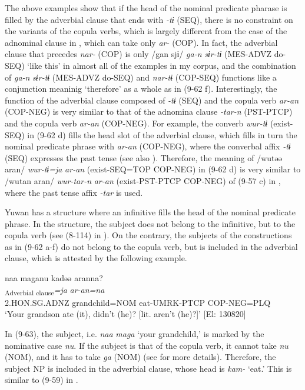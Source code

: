 The above examples show that if the head of the nominal predicate pharase is filled by the adverbial clause that ends with \textit{{}-tɨ} (SEQ), there is no constraint on the variants of the copula verbs, which is largely different from the case of the adnominal clause in , which can take only \textit{ar-} (COP). In fact, the adverbial clause that precedes \textit{nar-} (COP) is only /gan sjɨ/ \textit{ga-n} \textit{sɨr-tɨ} (MES-ADVZ do-SEQ) ‘like this’ in almost all of the examples in my corpus, and the combination of \textit{ga-n} \textit{sɨr-tɨ} (MES-ADVZ do-SEQ) and \textit{nar-tɨ} (COP-SEQ) functions like a conjunction meaninig ‘therefore’ as a whole as in (9-62 f). Interestingly, the function of the adverbial clause composed of \textit{{}-tɨ} (SEQ) and the copula verb \textit{ar-an} (COP-NEG) is very similar to that of the adnomina clause \textit{{}-tar-n} (PST-PTCP) and the copula verb \textit{ar-an} (COP-NEG). For example, the converb \textit{wur-tɨ} (exist-SEQ) in (9-62 d) fills the head slot of the adverbial clause, which fills in turn the nominal predicate phrase with \textit{ar-an} (COP-NEG), where the converbal affix \textit{{}-tɨ} (SEQ) expresses the past tense (see also ). Therefore, the meaning of /wutəə aran/ \textit{wur-tɨ=ja} \textit{ar-an} (exist-SEQ=TOP COP-NEG) in (9-62 d) is very similar to /wutan aran/ \textit{wur-tar-n} \textit{ar-an} (exist-PST-PTCP COP-NEG) of (9-57 c) in , where the past tense affix \textit{-tar} is used.

Yuwan has a structure where an infinitive fills the head of the nominal predicate phrase. In the structure, the subject does not belong to the infinitive, but to the copula verb (see (8-114) in ). On the contrary, the subjects of the constructions as in (9-62 a-f) do not belong to the copula verb, but is included in the adverbial clause, which is attested by the following example.

\ea  \label{ex:9.63}
 \glll  naa  maganu  kadəə  aranna?\\
    [\textit{naa}  \textit{maga=\Highlight{nu}}  \textit{kam-tɨ}]\textsubscript{Adverbial clause}\textit{=ja}  \textit{ar-an=na}\\
    2.HON.SG.ADNZ  grandchild=NOM  eat-UMRK-PTCP  COP-NEG=PLQ\\
    \glt     ‘Your grandson ate (it), didn’t (he)? [lit. aren’t (he)?]’ [El: 130820]
\z

In (9-63), the subject, i.e. \textit{naa} \textit{maga} ‘your grandchild,’ is marked by the nominative case \textit{nu}. If the subject is that of the copula verb, it cannot take \textit{nu} (NOM), and it has to take \textit{ga} (NOM) (see  for more details). Therefore, the subject NP is included in the adverbial clause, whose head is \textit{kam-} ‘eat.’ This is similar to (9-59) in .

